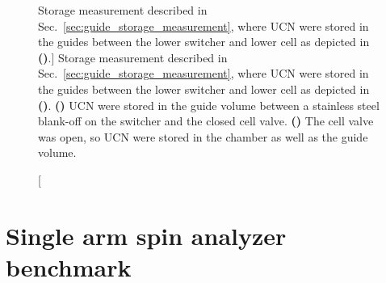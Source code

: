 \begin{figure}
\begin{subfigure}{\textwidth}
  \caption{}\label{subfig:2022_guide_storage_schematic}
\end{subfigure}
\caption
    [Storage measurement described in Sec.~\ref{sec:guide_storage_measurement}, where UCN were stored in the guides between the lower switcher and lower cell as depicted in \textbf{()}.]
    {Storage measurement described in Sec.~\ref{sec:guide_storage_measurement}, where UCN were stored in the guides between the lower switcher and lower cell as depicted in \textbf{()}. \textbf{()} UCN were stored in the guide volume between a stainless steel blank-off on the switcher and the closed cell valve. \textbf{()} The cell valve was open, so UCN were stored in the chamber as well as the guide volume.}
\label{fig:2022_ucn_guide_storage}
\end{figure}



\section{Single arm spin analyzer benchmark}




